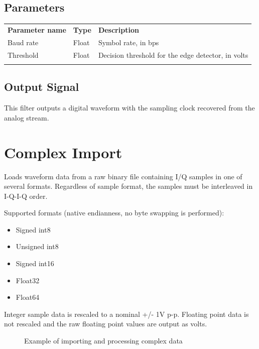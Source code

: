 \subsection{Parameters}

\begin{tabularx}{16cm}{llX}
\thickhline
\textbf{Parameter name} & \textbf{Type} & \textbf{Description} \\
\thickhline
Baud rate & Float & Symbol rate, in bps \\
\thinhline
Threshold & Float & Decision threshold for the edge detector, in volts \\
\thickhline
\end{tabularx}

\subsection{Output Signal}

This filter outputs a digital waveform with the sampling clock recovered from the analog stream.

\pagebreak
\section{Complex Import}

Loads waveform data from a raw binary file containing I/Q samples in one of several formats. Regardless of sample
format, the samples must be interleaved in I-Q-I-Q order.

Supported formats (native endianness, no byte swapping is performed):
\begin{itemize}
\item Signed int8
\item Unsigned int8
\item Signed int16
\item Float32
\item Float64
\end{itemize}

Integer sample data is rescaled to a nominal +/- 1V p-p. Floating point data is not rescaled and the raw floating point
values are output as volts.

\begin{figure}[h]
\centering
{}
\caption{Example of importing and processing complex data}
\label{filter_compleximport}
\end{figure}


